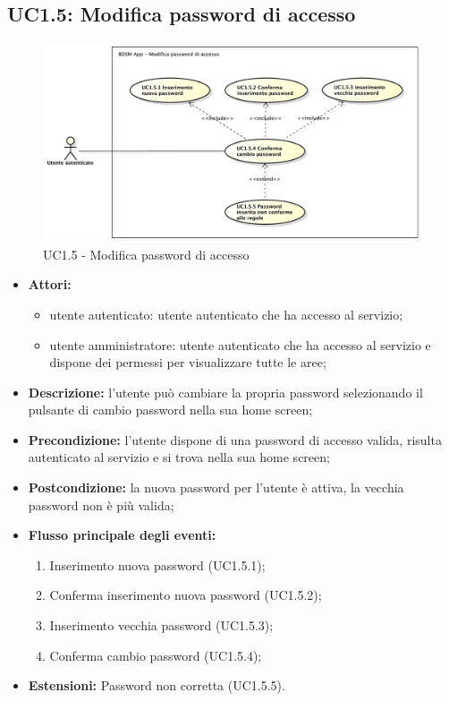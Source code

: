 \pagebreak


\subsection{UC1.5: Modifica password di accesso}

\begin{figure}[!htbp]
    \centering
    \centerline{\includegraphics[scale=0.45]{./images/UC1_5.pdf}}
    \caption{UC1.5 - Modifica password di accesso}
\end{figure}

\begin{itemize}
   	\item \textbf{Attori:}
    \begin{itemize}
    	\item utente autenticato: utente autenticato che ha accesso al servizio;
    	\item utente amministratore: utente autenticato che ha accesso al servizio e dispone dei permessi per visualizzare tutte le aree;
	\end{itemize}
	  \item \textbf{Descrizione:} l'utente può cambiare la propria password selezionando il pulsante di cambio password nella sua home screen;
    \item \textbf{Precondizione:} l'utente dispone di una password di accesso valida, risulta autenticato al servizio e si trova nella sua home screen;
    \item \textbf{Postcondizione:} la nuova password per l'utente è attiva, la vecchia password non è più valida;
	\item \textbf{Flusso principale degli eventi:}
    \begin{enumerate}
        \item Inserimento nuova password (UC1.5.1);
        \item Conferma inserimento nuova password (UC1.5.2);
        \item Inserimento vecchia password (UC1.5.3);
        \item Conferma cambio password (UC1.5.4);
    \end{enumerate}
   	\item \textbf{Estensioni:} Password non corretta (UC1.5.5).

\end{itemize}


